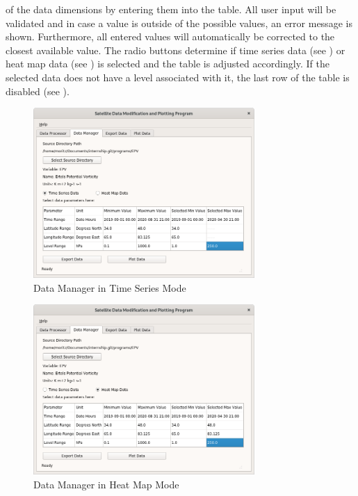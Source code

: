 \documentclass[../00_main.tex]{subfiles}
\begin{document}
\begin{enumerate}
        of the data dimensions by entering them into the table. All user
        input will be validated and in case a value is outside of the possible
        values, an error message is shown. Furthermore, all entered values will
        automatically be corrected to the closest available value. The radio
        buttons determine if time series data (see ) or heat map 
        data (see ) is selected and
        the table is adjusted accordingly. If the selected data does not have
        a level associated with it, the last row of the table is disabled (see
        ).
        \begin{figure}[H]
            \center
            \includegraphics[width=0.75\textwidth]{../graphics/dm03}
            \caption{Data Manager in Time Series Mode}
            \label{dm03}
        \end{figure}
        \begin{figure}[H]
            \center
            \includegraphics[width=0.75\textwidth]{../graphics/dm04}
            \caption{Data Manager in Heat Map Mode}
            \label{dm04}

\end{figure}
\end{enumerate}
\end{document}
